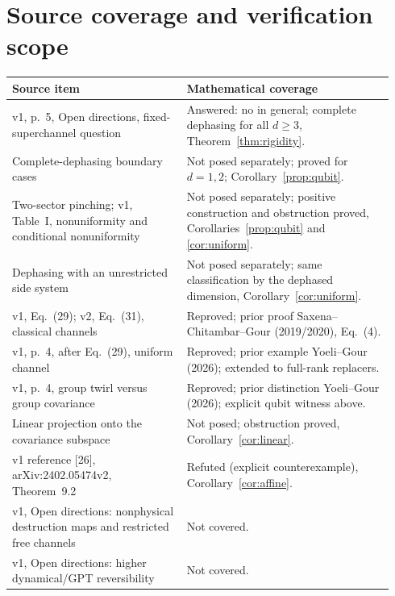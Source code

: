 \documentclass[11pt]{article}
\begin{document}
\section{Source coverage and verification scope}
\begin{center}\small
\begin{tabular}{@{}>{\raggedright\arraybackslash}p{0.43\linewidth}>{\raggedright\arraybackslash}p{0.51\linewidth}@{}}
\toprule
Source item & Mathematical coverage\\
\midrule
v1, p.~5, Open directions, fixed-superchannel question & Answered: no in general;
complete dephasing for all $d\geq3$,
Theorem~\ref{thm:rigidity}.\\
Complete-dephasing boundary cases & Not posed separately; proved for $d=1,2$;
Corollary~\ref{prop:qubit}.\\
Two-sector pinching; v1, Table~I, nonuniformity and conditional nonuniformity & Not posed separately;
positive construction and obstruction proved,
Corollaries~\ref{prop:qubit} and \ref{cor:uniform}.\\
Dephasing with an unrestricted side system & Not posed separately; same
classification by the dephased dimension, Corollary~\ref{cor:uniform}.\\
v1, Eq.~(29); v2, Eq.~(31), classical channels & Reproved; prior proof
Saxena--Chitambar--Gour (2019/2020), Eq.~(4).\\
v1, p.~4, after Eq.~(29), uniform channel & Reproved; prior example
Yoeli--Gour (2026); extended to full-rank replacers.\\
v1, p.~4, group twirl versus group covariance & Reproved; prior distinction
Yoeli--Gour (2026); explicit qubit witness above.\\
Linear projection onto the covariance subspace & Not posed; obstruction proved,
Corollary~\ref{cor:linear}.\\
v1 reference [26], arXiv:2402.05474v2, Theorem~9.2 & Refuted (explicit
counterexample), Corollary~\ref{cor:affine}.\\
v1, Open directions: nonphysical destruction maps and restricted free channels
& Not covered.\\
v1, Open directions: higher dynamical/GPT reversibility
& Not covered.\\
\bottomrule
\end{tabular}
\end{center}
\end{document}
